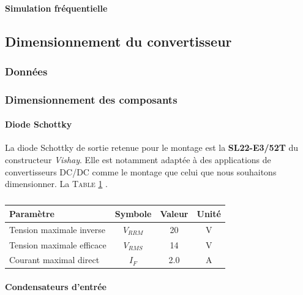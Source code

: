 \documentclass[a4paper,12pt]{book}
\begin{document}
					\paragraph{Simulation fréquentielle}  
					
								
				
			\subsection{Dimensionnement du convertisseur}
			
				\subsubsection{Données }
				
				\subsubsection{Dimensionnement des composants}
				
					\paragraph{Diode Schottky}
					
					La diode Schottky de sortie retenue pour le montage est la \textbf{SL22-E3/52T} du constructeur \textit{Vishay}. Elle est notamment adaptée à des applications de convertisseurs DC/DC comme le montage que celui que nous souhaitons dimensionner. La \textsc{Table \ref{charact_schottky}} \cite{SL22}.
					
					\begin{table}
						\begin{center}
							\begin{tabular}{|l|c|c|c}
							\hline
							Paramètre & Symbole & Valeur & Unité \\
							\hline						
							Tension maximale inverse & $V_{RRM}$ & 20 & V \\
							\hline						
							Tension maximale efficace & $V_{RMS}$ & 14 & V \\
							\hline						
							Courant maximal direct & $I_{F}$ & 2.0 & A \\
							\hline						
							\end{tabular}					
						\end{center}
						\caption{}
						\label{charact_schottky}
					\end{table}
				
					\paragraph{Condensateurs d'entrée}
					
\end{document}
